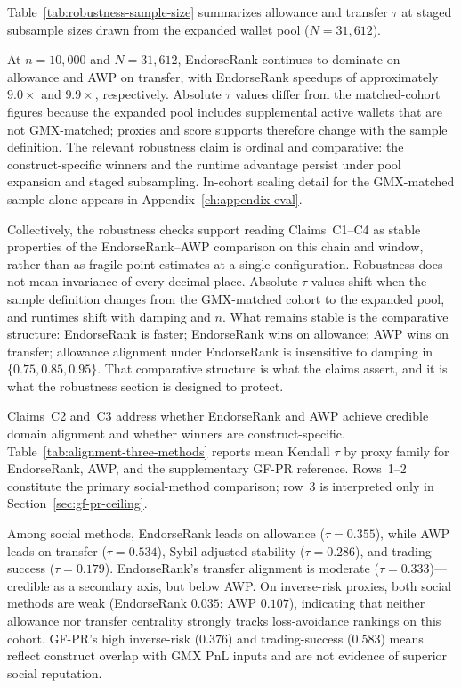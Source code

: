 Table~\ref{tab:robustness-sample-size} summarizes allowance and transfer $\tau$ at staged subsample sizes drawn from the expanded wallet pool ($N=31{,}612$).



At $n=10{,}000$ and $N=31{,}612$, EndorseRank continues to dominate on allowance and AWP on transfer, with EndorseRank speedups of approximately $9.0\times$ and $9.9\times$, respectively. Absolute $\tau$ values differ from the matched-cohort figures because the expanded pool includes supplemental active wallets that are not GMX-matched; proxies and score supports therefore change with the sample definition. The relevant robustness claim is ordinal and comparative: the construct-specific winners and the runtime advantage persist under pool expansion and staged subsampling. In-cohort scaling detail for the GMX-matched sample alone appears in Appendix~\ref{ch:appendix-eval}.

Collectively, the robustness checks support reading Claims~C1--C4 as stable properties of the EndorseRank--AWP comparison on this chain and window, rather than as fragile point estimates at a single configuration. Robustness does not mean invariance of every decimal place. Absolute $\tau$ values shift when the sample definition changes from the GMX-matched cohort to the expanded pool, and runtimes shift with damping and $n$. What remains stable is the comparative structure: EndorseRank is faster; EndorseRank wins on allowance; AWP wins on transfer; allowance alignment under EndorseRank is insensitive to damping in $\{0.75, 0.85, 0.95\}$. That comparative structure is what the claims assert, and it is what the robustness section is designed to protect.


Claims~C2 and~C3 address whether EndorseRank and AWP achieve credible domain alignment and whether winners are construct-specific. Table~\ref{tab:alignment-three-methods} reports mean Kendall $\tau$ by proxy family for EndorseRank, AWP, and the supplementary GF-PR reference. Rows~1--2 constitute the primary social-method comparison; row~3 is interpreted only in Section~\ref{sec:gf-pr-ceiling}.



Among social methods, EndorseRank leads on allowance ($\tau=0.355$), while AWP leads on transfer ($\tau=0.534$), Sybil-adjusted stability ($\tau=0.286$), and trading success ($\tau=0.179$). EndorseRank's transfer alignment is moderate ($\tau=0.333$)---credible as a secondary axis, but below AWP. On inverse-risk proxies, both social methods are weak (EndorseRank $0.035$; AWP $0.107$), indicating that neither allowance nor transfer centrality strongly tracks loss-avoidance rankings on this cohort. GF-PR's high inverse-risk ($0.376$) and trading-success ($0.583$) means reflect construct overlap with GMX PnL inputs and are not evidence of superior social reputation.

